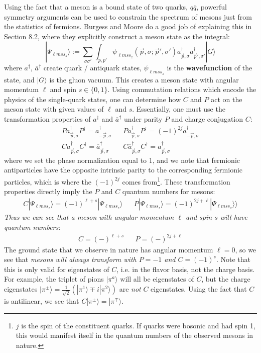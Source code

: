 \documentclass[11pt, oneside]{article}   	%
\theoremstyle{definition}
\numberwithin{equation}{subsection}		%
\begin{document}
Using the fact that a meson is a bound state of two quarks, $q\overline q$, powerful symmetry arguments can be used to constrain the 
spectrum of mesons just from the statistics of fermions. Burgess and Moore do a good job of explaining this in Section 8.2, where they 
explicitly construct a meson state as the integral:
\begin{equation}
	|\Psi_{\ell m s s_z}\rangle := \sum_{\sigma\sigma'}\int_{p, p'} \psi_{\ell m s s_z}(\vec p, \sigma; \vec p', \sigma') a_{\vec p, \sigma}^\dagger 
	\overline{a}_{\vec p', \sigma'}^\dagger |G\rangle
\end{equation}
where $a^\dagger$, $\overline a^\dagger$ create quark / antiquark states, $\psi_{\ell m s s_z}$ is the \textbf{wavefunction} of the state, and $|G\rangle$ is 
the gluon vacuum. This creates a meson state with angular momentum $\ell$ and spin $s\in \{0, 1\}$. Using commutation relations which encode 
the physics of the single-quark states, one can determine how $C$ and $P$ act on the meson state with given values of $\ell$ and $s$. Essentially, 
one must use the transformation properties of $a^\dagger$ and $\overline{a}^\dagger$ under parity $P$ and charge conjugation $C$:
\begin{align}
	P a_{\vec p, \sigma}^\dagger P^\dagger = a_{-\vec p, \sigma}^\dagger && P \overline{a}_{\vec p, \sigma}^\dagger P^\dagger = (-1)^{2j} \overline{a}_{-\vec p, \sigma}^\dagger \\
	C a_{\vec p, \sigma}^\dagger C^\dagger = \overline{a}_{\vec p, \sigma}^\dagger && C \overline{a}_{\vec p, \sigma}^\dagger C^\dagger = a_{\vec p, \sigma}^\dagger
\end{align}
where we set the phase normalization equal to 1, and we note that fermionic antiparticles have the opposite intrinsic parity to the 
corresponding fermionic particles, which is where the $(-1)^{2j}$ comes from\footnote{$j$ is the spin of the constituent quarks. If quarks were bosonic 
and had spin 1, this would manifest itself in the quantum numbers of the observed mesons in nature.}. 
These transformation properties directly imply the $P$ and $C$ quantum numbers for mesons:
\begin{align}
	C |\Psi_{\ell m s s_z}\rangle = (-1)^{\ell + s}|\Psi_{\ell m s s_z}\rangle && P|\Psi_{\ell m s s_z}\rangle = (-1)^{2j + \ell} |\Psi_{\ell m s s_z}\rangle
	\rangle
\end{align}
\textit{Thus we can see that a meson with angular momentum $\ell$ and spin $s$ will have quantum numbers}:
\begin{align}
	C = (-)^{\ell + s} && P = (-)^{2j + \ell}
\end{align}
The ground state that we observe in nature has angular momentum $\ell = 0$, so we see that \textit{mesons will always transform with $P = -1$ and 
$C = (-1)^s$}. Note that this is only valid for eigenstates of $C$, i.e. in the flavor basis, not the charge basis. For example, the triplet of pions $|\pi^a\rangle$ 
will all be eigenstates of $C$, but the charge eigenstates $|\pi^\pm\rangle = \frac{1}{\sqrt 2}(|\pi^1\rangle \mp i|\pi^2\rangle)$ are \textit{not} $C$ 
eigenstates. Using the fact that $C$ is antilinear, we see that $C|\pi^\pm\rangle = |\pi^\mp\rangle$. 
\end{document}
